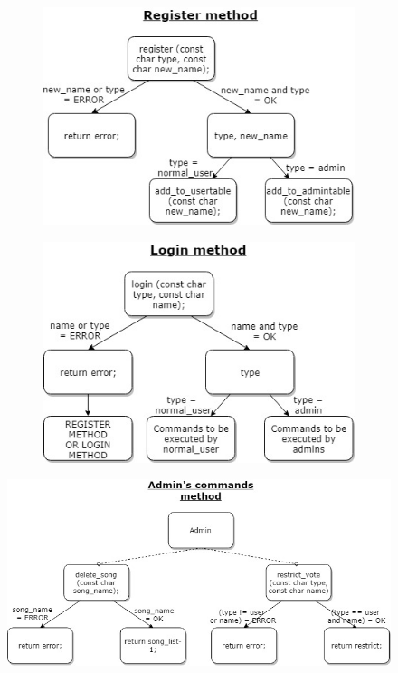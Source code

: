 \documentclass[a4paper]{article}
\begin{document}
\begin{figure}[H]
\centering
\begin{subfigure}[H]{.5\linewidth}
    \includegraphics[width=\linewidth]{images/Diagram_register.jpg}
\end{subfigure}%
\begin{subfigure}[H]{.5\linewidth}
    \includegraphics[width=\linewidth]{images/Diagram_login.jpg}
\end{subfigure}
\end{figure}

\endgroup
\vspace*{\fill}

\newpage

\vspace*{\fill}
\begingroup
\centering

\begin{figure}[H]
\centering
\includegraphics[width=12cm]{images/Diagram_admin_commands.jpg}
\end{figure}
\end{document}
